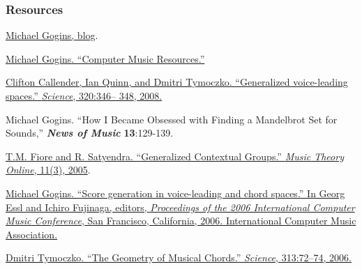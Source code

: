 \documentclass{beamer}
\begin{document}
\begin{frame}[allowframebreaks]
  \frametitle<presentation>{Resources}
    
  \begin{thebibliography}{10}
    
  \beamertemplatebookbibitems

   \href{http://michaelgogins.tumblr.com/}{Michael Gogins, blog}.
  
   \href{https://github.com/gogins/gogins.github.io}{Michael Gogins. ``Computer Music Resources.''}

   \href{http://www.sciencemag.org/content/320/5874/346.abstract}{Clifton Callender, Ian Quinn, and Dmitri Tymoczko. ``Generalized voice-leading spaces.'' \emph{Science}, 320:346–
348, 2008.}

   {Michael Gogins. ``How I Became Obsessed with Finding a Mandelbrot Set for Sounds,'' \textbf{\textit{News of Music}} \textbf{13}:129-139.}

   \href{http://www.mtosmt.org/issues/mto.05.11.3/mto.05.11.3.fiore_satyendra.pdf}{T.M. Fiore and R. Satyendra. ``Generalized Contextual
Groups.'' \emph{Music Theory Online}, 11(3), 2005}.

    \href{https://www.dropbox.com/s/ztej71n2fbn4tq4/Lindenmayer_Systems_Based_on_Riemannian_Transformations.pdf}{Michael Gogins. ``Score generation in voice-leading
and chord spaces.'' In Georg Essl and Ichiro Fujinaga,
editors, \emph{Proceedings of the 2006 International Computer Music Conference}, San Francisco, California,
2006. International Computer Music Association.}

   \href{http://www.sciencemag.org/content/313/5783/72.abstract?ijkey=wzKBea3ktKdu2&keytype=ref&siteid=sci}{Dmitri Tymoczko. ``The Geometry of Musical Chords.'' \emph{Science}, 313:72–74, 2006.}

  \end{thebibliography}

\end{frame}
\end{document}
